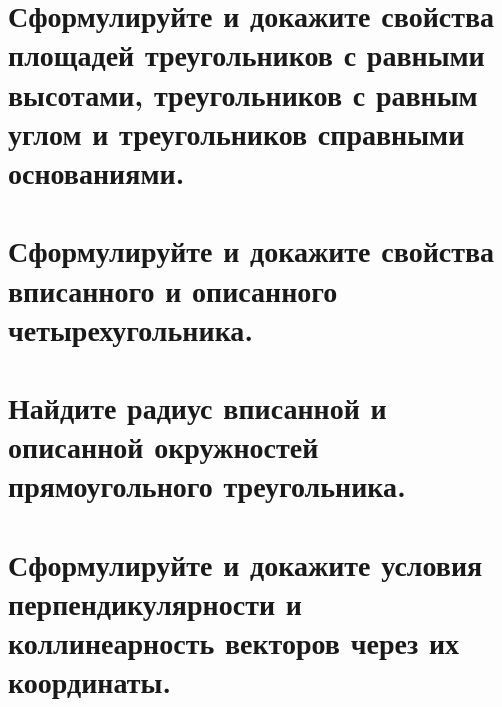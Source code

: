 \documentclass[12pt, letterpaper]{article}
\begin{document}
\section {Сформулируйте и докажите свойства площадей треугольников с равными высотами, треугольников с равным углом и треугольников справными основаниями.}
\section {Сформулируйте и докажите свойства вписанного и описанного четырехугольника.}
\section {Найдите радиус вписанной и описанной окружностей прямоугольного треугольника.}
\section {Сформулируйте и докажите условия перпендикулярности и коллинеарность векторов через их координаты.} 
\end{document}
